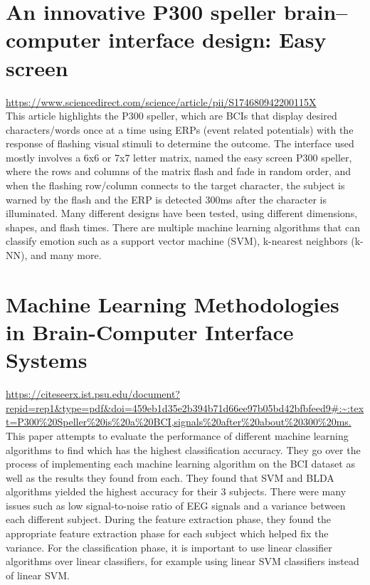 \documentclass[12pt]{article}
\begin{document}
\section{An innovative P300 speller brain–computer interface design: Easy screen}
\url{https://www.sciencedirect.com/science/article/pii/S174680942200115X} \\
This article highlights the P300 speller, which are BCIs that display desired characters/words once at a time using ERPs (event related potentials) with the response of flashing visual stimuli to determine the outcome. The interface used mostly involves a 6x6 or 7x7 letter matrix, named the easy screen P300 speller, where the rows and columns of the matrix flash and fade in random order, and when the flashing row/column connects to the target character, the subject is warned by the flash and the ERP is detected 300ms after the character is illuminated. Many different designs have been tested, using different dimensions, shapes, and flash times. There are multiple machine learning algorithms that can classify emotion such as a support vector machine (SVM), k-nearest neighbors (k-NN), and many more. 


\section{Machine Learning Methodologies in Brain-Computer Interface Systems}
\url{https://citeseerx.ist.psu.edu/document?repid=rep1&type=pdf&doi=459eb1d35e2b394b71d66ee97b05bd42bfbfeed9#:~:text=P300%20Speller%20is%20a%20BCI,signals%20after%20about%20300%20ms.} \\
This paper attempts to evaluate the performance of different machine learning algorithms to find which has the highest classification accuracy. They go over the process of implementing each machine learning algorithm on the BCI dataset as well as the results they found from each. They found that SVM and BLDA algorithms yielded the highest accuracy for their 3 subjects. There were many issues such as low signal-to-noise ratio of EEG signals and a variance between each different subject. During the feature extraction phase, they found the appropriate feature extraction phase for each subject which helped fix the variance. For the classification phase, it is important to use linear classifier algorithms over linear classifiers, for example using linear SVM classifiers instead of linear SVM. 
\end{document}
